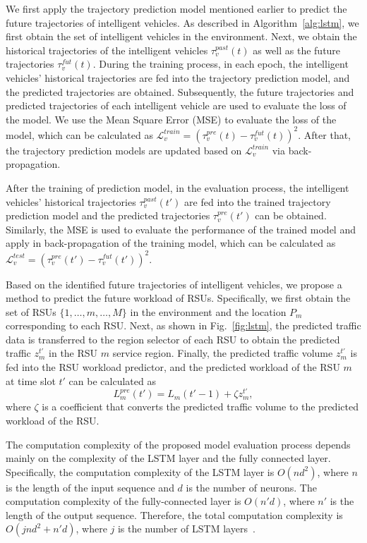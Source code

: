 \documentclass[lettersize,journal]{IEEEtran}
\begin{document}
We first apply the trajectory prediction model mentioned earlier to predict the future trajectories of intelligent vehicles. As described in Algorithm~\ref{alg:lstm}, we first obtain the set of intelligent vehicles in the environment. Next, we obtain the historical trajectories of the intelligent vehicles $\tau_{v}^{past}(t)$ as well as the future trajectories $\tau_{v}^{fut}(t)$. During the training process, in each epoch, the intelligent vehicles' historical trajectories are fed into the trajectory prediction model, and the predicted trajectories are obtained. Subsequently, the future trajectories and predicted trajectories of each intelligent vehicle are used to evaluate the loss of the model. We use the Mean Square Error (MSE) to evaluate the loss of the model, which can be calculated as $\mathcal{L}_{v}^{train} = (\tau_v^{pre}(t)-\tau_v^{fut}(t))^2$. After that, the trajectory prediction models are updated based on $\mathcal{L}_{v}^{train}$ via back-propagation.

After the training of prediction model, in the evaluation process, the intelligent vehicles' historical trajectories $\tau_{v}^{past}(t')$ are fed into the trained trajectory prediction model and the predicted trajectories $\tau_{v}^{pre}(t')$ can be obtained. Similarly, the MSE is used to evaluate the performance of the trained model and apply in back-propagation of the training model, which can be calculated as $\mathcal{L}_{v}^{test} = (\tau_v^{pre}(t')-\tau_v^{fut}(t'))^2$.

Based on the identified future trajectories of intelligent vehicles, we propose a method to predict the future workload of RSUs. Specifically, we first obtain the set of RSUs ${\{1,\dots,m,\dots,M\}}$ in the environment and the location $P_{m}$ corresponding to each RSU. Next, as shown in Fig.~\ref{fig:lstm}, the predicted traffic data is transferred to the region selector of each RSU to obtain the predicted traffic $z_m^{t'}$ in the RSU $m$ service region. Finally, the predicted traffic volume $z_m^{t'}$ is fed into the RSU workload predictor, and the predicted workload of the RSU $m$ at time slot $t'$ can be calculated as 
\begin{equation}
L_m^{pre}(t')= L_m(t'-1) + \zeta z_m^{t'},\label{predload}
\end{equation}
where $\zeta$ is a coefficient that converts the predicted traffic volume to the predicted workload of the RSU.

The computation complexity of the proposed model evaluation process depends mainly on the complexity of the LSTM layer and the fully connected layer. Specifically, the computation complexity of the LSTM layer is $O(nd^2)$, where $n$ is the length of the input sequence and $d$ is the number of neurons. The computation complexity of the fully-connected layer is $O(n'd)$, where $n'$ is the length of the output sequence. Therefore, the total computation complexity is $O(jnd^2+n'd)$, where $j$ is the number of LSTM layers~\cite{freire2021experimental}.
\end{document}
